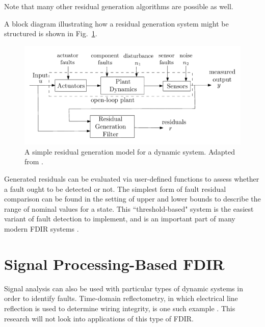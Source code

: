 Note that many other residual generation algorithms are possible as well.

A block diagram illustrating how a residual generation system might be structured is shown in Fig.~\ref{fig:residual_block_diagram}.

\begin{figure}[h]
\centering
    \includegraphics{images/residual_block_diagram.png}
    \caption{A simple residual generation model for a dynamic system. Adapted from \cite{hwang2010survey}.}
    \label{fig:residual_block_diagram}
\end{figure}

Generated residuals can be evaluated via user-defined functions to assess whether a fault ought to be detected or not. The simplest form of fault residual comparison can be found in the setting of upper and lower bounds to describe the range of nominal values for a state. This ``threshold-based" system is the easiest variant of fault detection to implement, and is an important part of many modern FDIR systems \cite{walker1979fault}.

\section{Signal Processing-Based FDIR}

Signal analysis can also be used with particular types of dynamic systems in order to identify faults. Time-domain reflectometry, in which electrical line reflection is used to determine wiring integrity, is one such example \cite{lo2005noise}. This research will not look into applications of this type of FDIR.



